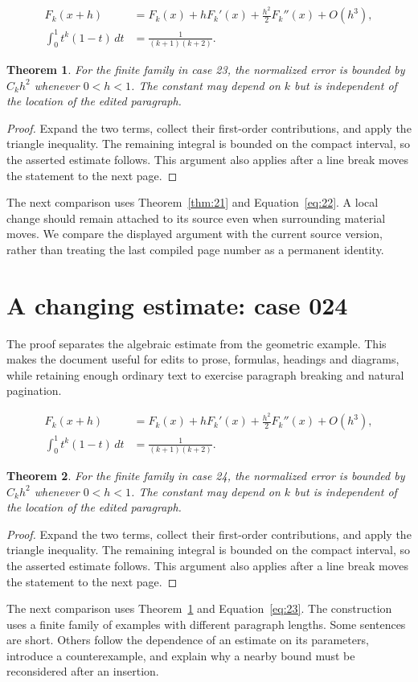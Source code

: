 \documentclass[a4paper,10pt]{article}
\newtheorem{theorem}{Theorem}[section]
\begin{document}
\lipsum[7-8]
\begin{align}\label{eq:22}
 F_k(x+h)&=F_k(x)+hF_k'(x)+\frac{h^2}{2}F_k''(x)+O(h^3),\\
 \int_0^1 t^k(1-t)\,dt&=\frac{1}{(k+1)(k+2)}.
\end{align}
\begin{theorem}\label{thm:22}
For the finite family in case 23, the normalized error is bounded by $C_k h^2$ whenever $0<h<1$. The constant may depend on $k$ but is independent of the location of the edited paragraph.
\end{theorem}
\begin{proof}
Expand the two terms, collect their first-order contributions, and apply the
triangle inequality. The remaining integral is bounded on the compact interval,
so the asserted estimate follows. This argument also applies after a line break
moves the statement to the next page.
\end{proof}
The next comparison uses Theorem~\ref{thm:21} and Equation~\ref{eq:22}. A local change should remain attached to its source even when surrounding material moves. We compare the displayed argument with the current source version, rather than treating the last compiled page number as a permanent identity.

\lipsum[13]

\section{A changing estimate: case 024}\label{unit:23}
The proof separates the algebraic estimate from the geometric example. This makes the document useful for edits to prose, formulas, headings and diagrams, while retaining enough ordinary text to exercise paragraph breaking and natural pagination.

\lipsum[10-11]
\begin{align}\label{eq:23}
 F_k(x+h)&=F_k(x)+hF_k'(x)+\frac{h^2}{2}F_k''(x)+O(h^3),\\
 \int_0^1 t^k(1-t)\,dt&=\frac{1}{(k+1)(k+2)}.
\end{align}
\begin{theorem}\label{thm:23}
For the finite family in case 24, the normalized error is bounded by $C_k h^2$ whenever $0<h<1$. The constant may depend on $k$ but is independent of the location of the edited paragraph.
\end{theorem}
\begin{proof}
Expand the two terms, collect their first-order contributions, and apply the
triangle inequality. The remaining integral is bounded on the compact interval,
so the asserted estimate follows. This argument also applies after a line break
moves the statement to the next page.
\end{proof}
The next comparison uses Theorem~\ref{thm:22} and Equation~\ref{eq:23}. The construction uses a finite family of examples with different paragraph lengths. Some sentences are short. Others follow the dependence of an estimate on its parameters, introduce a counterexample, and explain why a nearby bound must be reconsidered after an insertion.
\end{document}
